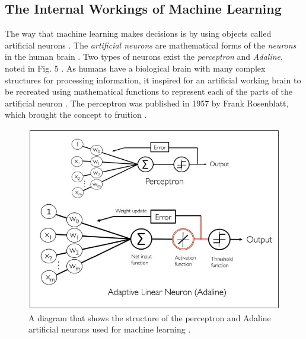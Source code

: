 \documentclass[a4paper, 12pt]{article}
\begin{document}
\subsection{The Internal Workings of Machine Learning}
\begin{paragraph}
\indent The way that machine learning makes decisions is by using objects called artificial neurons \cite{pythonML}. The \textit{artificial neurons} are mathematical forms of the \textit{neurons} in the human brain \cite{pythonML}. Two types of neurons exist the \textit{perceptron} and \textit{Adaline}, noted in Fig. 5 \cite{pythonML}.  As humans have a biological brain with many complex structures for processing information, it inspired for an artificial working brain to be recreated using mathematical functions to represent each of the parts of the artificial neuron \cite{pythonML}. The perceptron was published in 1957 by Frank Rosenblatt, which brought the concept to fruition \cite{pythonML}.
\par

\begin{figure}[!hb]
\centering
\includegraphics[scale=0.63]{neurons}
\caption{A diagram that shows the structure of the perceptron and Adaline artificial neurons used for machine learning \cite{Neuron}.}
\end{figure}


\end{paragraph}
\end{document}

